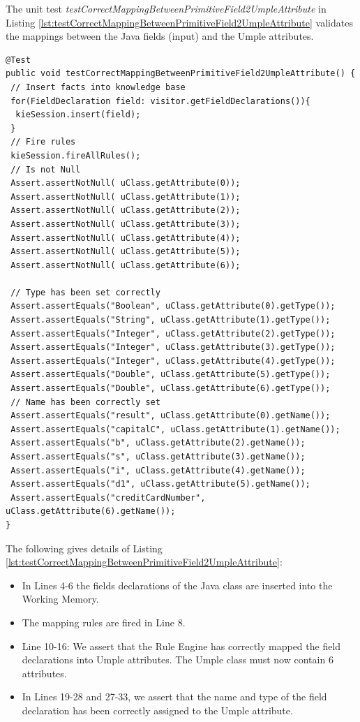 The unit test \textit{testCorrectMappingBetweenPrimitiveField2UmpleAttribute} in Listing \ref{lst:testCorrectMappingBetweenPrimitiveField2UmpleAttribute} validates the mappings between the Java fields (input) and the Umple attributes. 
\begin{lstlisting}[style=java, label=lst:testCorrectMappingBetweenPrimitiveField2UmpleAttribute, caption=Test asserting mappings of fields and attributes]
@Test
public void testCorrectMappingBetweenPrimitiveField2UmpleAttribute() {
 // Insert facts into knowledge base
 for(FieldDeclaration field: visitor.getFieldDeclarations()){
  kieSession.insert(field);
 }
 // Fire rules
 kieSession.fireAllRules();
 // Is not Null
 Assert.assertNotNull( uClass.getAttribute(0));
 Assert.assertNotNull( uClass.getAttribute(1));
 Assert.assertNotNull( uClass.getAttribute(2));
 Assert.assertNotNull( uClass.getAttribute(3));
 Assert.assertNotNull( uClass.getAttribute(4));
 Assert.assertNotNull( uClass.getAttribute(5));
 Assert.assertNotNull( uClass.getAttribute(6));

 // Type has been set correctly
 Assert.assertEquals("Boolean", uClass.getAttribute(0).getType());
 Assert.assertEquals("String", uClass.getAttribute(1).getType());
 Assert.assertEquals("Integer", uClass.getAttribute(2).getType());
 Assert.assertEquals("Integer", uClass.getAttribute(3).getType());
 Assert.assertEquals("Integer", uClass.getAttribute(4).getType());
 Assert.assertEquals("Double", uClass.getAttribute(5).getType());
 Assert.assertEquals("Double", uClass.getAttribute(6).getType());
 // Name has been correctly set
 Assert.assertEquals("result", uClass.getAttribute(0).getName());
 Assert.assertEquals("capitalC", uClass.getAttribute(1).getName());
 Assert.assertEquals("b", uClass.getAttribute(2).getName());
 Assert.assertEquals("s", uClass.getAttribute(3).getName());
 Assert.assertEquals("i", uClass.getAttribute(4).getName());
 Assert.assertEquals("d1", uClass.getAttribute(5).getName());
 Assert.assertEquals("creditCardNumber", uClass.getAttribute(6).getName());
}
\end{lstlisting}
The following gives details of Listing \ref{lst:testCorrectMappingBetweenPrimitiveField2UmpleAttribute}:
\begin{itemize}
\item In Lines 4-6 the fields declarations of the Java class are inserted into the Working Memory.
\item The mapping rules are fired in Line 8. 
\item Line 10-16: We assert that the Rule Engine has correctly mapped the field declarations into Umple attributes. The Umple class must now contain 6 attributes. 
\item In Lines 19-28 and 27-33, we assert that the name and type of the field declaration has been correctly assigned to the Umple attribute.
\end{itemize}


